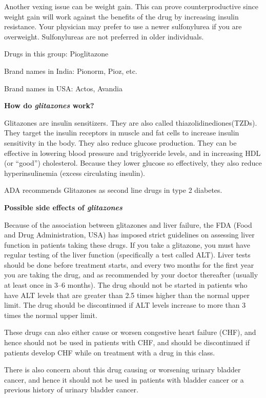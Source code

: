 Another vexing issue can be weight gain. This can prove counterproductive since weight gain will work against the benefits of the drug by increasing insulin resistance. Your physician may prefer to use a newer sulfonylurea if you are overweight. Sulfonylureas are not preferred in older individuals.


Drugs in this group: Pioglitazone

Brand names in India: Pionorm, Pioz, etc.

Brand names in USA: Actos, Avandia

\textbf{How do \textit{glitazones} work?}

Glitazones are insulin sensitizers. They are also called thiazolidinediones(TZDs). They target the insulin receptors in muscle and fat cells to increase insulin sensitivity in the body. They also reduce glucose production. They can be effective in lowering blood pressure and triglyceride levels, and in increasing HDL (or “good”) cholesterol. Because they lower glucose so effectively, they also reduce hyperinsulinemia (excess circulating insulin).

ADA recommends Glitazones as second line drugs in type 2 diabetes.

\textbf{Possible side effects of \textit{glitazones}}

Because of the association between glitazones and liver failure, the FDA (Food and Drug Administration, USA) has imposed strict guidelines on assessing liver function in patients taking these drugs. If you take a glitazone, you must have regular testing of the liver function (specifically a test called ALT). Liver tests should be done before treatment starts, and every two months for the first year you are taking the drug, and as recommended by your doctor thereafter (usually at least once in 3–6 months). The drug should not be started in patients who have ALT levels that are greater than 2.5 times higher than the normal upper limit. The drug should be discontinued if ALT levels increase to more than 3 times the normal upper limit.

These drugs can also either cause or worsen congestive heart failure (CHF), and hence should not be used in patients with CHF, and should be discontinued if patients develop CHF while on treatment with a drug in this class.

There is also concern about this drug causing or worsening urinary bladder cancer, and hence it should not be used in patients with bladder cancer or a previous history of urinary bladder cancer.

